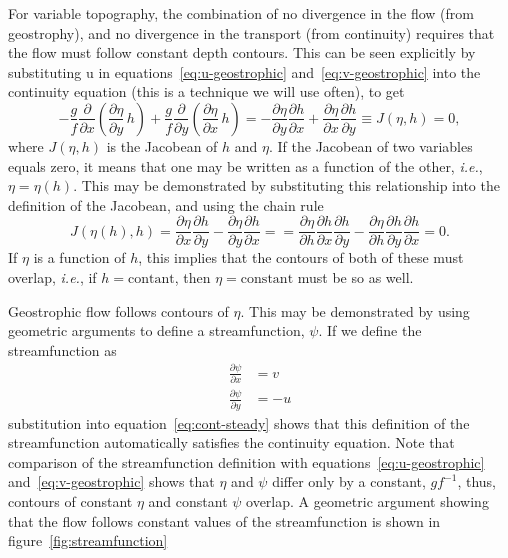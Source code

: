 \documentclass[11pt]{report}
\numberwithin{equation}{section}
\begin{document}
For variable topography, the combination of no divergence in the flow (from geostrophy), and no divergence in the transport (from continuity) requires that the flow must follow constant depth contours.  This can be seen explicitly by substituting u in equations~\ref{eq:u-geostrophic} and~\ref{eq:v-geostrophic} into the continuity equation (this is a technique we will use often), to get
\begin{equation}
    - \frac{g}{f}\frac{\partial}{\partial x} (\frac{\partial \eta}{\partial y}\,h) 
        + \frac{g}{f}\frac{\partial }{\partial y} (\frac{\partial \eta}{\partial x}\,h)
    = - \frac{\partial \eta}{\partial y}\frac{\partial h}{\partial x}
        + \frac{\partial \eta}{\partial x}\frac{\partial h}{\partial y}
    \equiv J(\eta, h) = 0,
\end{equation}
where $J(\eta, h)$ is the Jacobean of $h$ and $\eta$.  If the Jacobean of two variables equals zero, it means that one may be written as a function of the other, \emph{i.e.}, $\eta=\eta(h)$.  This may be demonstrated by substituting this relationship into the definition of the Jacobean, and using the chain rule
\begin{equation}
    J(\eta(h), h) = 
          \frac{\partial \eta}{\partial x}\frac{\partial h}{\partial y} 
        - \frac{\partial \eta}{\partial y}\frac{\partial h}{\partial x} = 
        = \frac{\partial \eta}{\partial h}\frac{\partial h}{\partial x}\frac{\partial h}{\partial y} 
        - \frac{\partial \eta}{\partial h}\frac{\partial h}{\partial y}\frac{\partial h}{\partial x} = 0.
\end{equation}
If $\eta$ is a function of $h$, this implies that the contours of both of these must overlap, \emph{i.e.}, if $h=\mathrm{contant}$, then $\eta=\mathrm{constant}$ must be so as well.

Geostrophic flow follows contours of $\eta$.  This may be demonstrated by using geometric arguments to define a streamfunction, $\psi$.  If we define the streamfunction as
\begin{align}
    \frac{\partial \psi}{\partial x} &= v \\
    \frac{\partial \psi}{\partial y} &= - u
\end{align}
substitution into equation~\ref{eq:cont-steady} shows that this definition of the streamfunction automatically satisfies the continuity equation.  Note that comparison of the streamfunction definition with equations~\ref{eq:u-geostrophic} and~\ref{eq:v-geostrophic} shows that $\eta$ and $\psi$ differ only by a constant, $g f^{-1}$, thus, contours of constant $\eta$ and constant $\psi$ overlap.  A geometric argument showing that the flow follows constant values of the streamfunction is shown in figure~\ref{fig:streamfunction}
\end{document}
